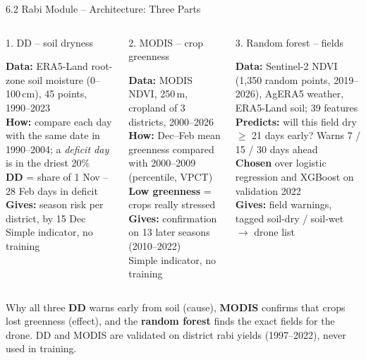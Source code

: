 \documentclass[aspectratio=169,10pt]{beamer}
\begin{document}
\begin{frame}{6.2 Rabi Module -- Architecture: Three Parts}
\begin{columns}[T,onlytextwidth]
\begin{card}[equal height group=rabi3]{1. DD -- soil dryness}
\footnotesize\raggedright
\textbf{Data:} ERA5-Land root-zone soil moisture (0--100\,cm), 45 points, 1990--2023\\[2pt]
\textbf{How:} compare each day with the same date in 1990--2004; a \emph{deficit day} is in the driest 20\%\\[2pt]
\textbf{DD} = share of 1 Nov -- 28 Feb days in deficit\\[2pt]
\textbf{Gives:} season risk per district, by 15 Dec\\[2pt]
{\color{muted}Simple indicator, no training}
\end{card}
\begin{card}[equal height group=rabi3]{2. MODIS -- crop greenness}
\footnotesize\raggedright
\textbf{Data:} MODIS NDVI, 250\,m, cropland of 3 districts, 2000--2026\\[2pt]
\textbf{How:} Dec--Feb mean greenness compared with 2000--2009 (percentile, VPCT)\\[2pt]
\textbf{Low greenness} = crops really stressed\\[2pt]
\textbf{Gives:} confirmation on 13 later seasons (2010--2022)\\[2pt]
{\color{muted}Simple indicator, no training}
\end{card}
\begin{card}[equal height group=rabi3]{3. Random forest -- fields}
\footnotesize\raggedright
\textbf{Data:} Sentinel-2 NDVI (1,350 random points, 2019--2026), AgERA5 weather, ERA5-Land soil; 39 features\\[2pt]
\textbf{Predicts:} will this field dry $\ge$ 21 days early? Warns 7 / 15 / 30 days ahead\\[2pt]
\textbf{Chosen} over logistic regression and XGBoost on validation 2022\\[2pt]
\textbf{Gives:} field warnings, tagged soil-dry / soil-wet $\rightarrow$ drone list
\end{card}
\end{columns}
\vspace{1mm}
\begin{keycard}{Why all three}
\footnotesize \textbf{DD} warns early from soil (cause), \textbf{MODIS} confirms that crops lost greenness (effect), and the \textbf{random forest} finds the exact fields for the drone. DD and MODIS are validated on district rabi yields (1997--2022), never used in training.
\end{keycard}
\end{frame}
\end{document}
